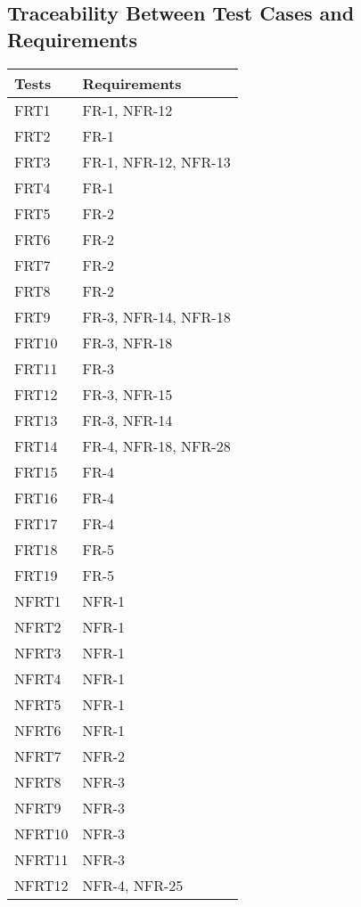 \documentclass[12pt, titlepage]{article}
\begin{document}
\newpage
\subsection{Traceability Between Test Cases and Requirements}

\begin{longtable}{| p{} | p{} |} 
  \hline
  \textbf{Tests}    &   \textbf{Requirements} \\ \hline
  FRT1 &  FR-1, NFR-12 \\ \hline          
  FRT2 &  FR-1  \\ \hline
  FRT3 &   FR-1, NFR-12, NFR-13 \\ \hline
   FRT4 &   FR-1 \\ \hline
   FRT5 &  FR-2  \\ \hline
   FRT6 &  FR-2  \\ \hline
  FRT7  &  FR-2  \\ \hline
  FRT8 &  FR-2  \\ \hline
  FRT9 &  FR-3, NFR-14, NFR-18  \\ \hline
  FRT10 &  FR-3, NFR-18  \\ \hline
  FRT11 &  FR-3  \\ \hline
  FRT12 &  FR-3, NFR-15  \\ \hline
  FRT13 &  FR-3, NFR-14  \\ \hline
  FRT14 &  FR-4, NFR-18, NFR-28  \\ \hline
  FRT15 &  FR-4  \\ \hline
  FRT16 &  FR-4  \\ \hline
  FRT17 &  FR-4  \\ \hline
  FRT18 &  FR-5  \\ \hline
  FRT19 &  FR-5  \\ \hline
  NFRT1 &  NFR-1  \\ \hline
  NFRT2 &  NFR-1  \\ \hline
  NFRT3 &  NFR-1  \\ \hline
  NFRT4 &  NFR-1  \\ \hline
  NFRT5 &  NFR-1  \\ \hline
  NFRT6 &  NFR-1  \\ \hline
  NFRT7 &  NFR-2  \\ \hline
  NFRT8 &  NFR-3  \\ \hline
  NFRT9 &   NFR-3 \\ \hline
  NFRT10 &  NFR-3  \\ \hline
  NFRT11 &  NFR-3  \\ \hline
  NFRT12 &  NFR-4, NFR-25  \\ \hline

\end{longtable}
\end{document}
